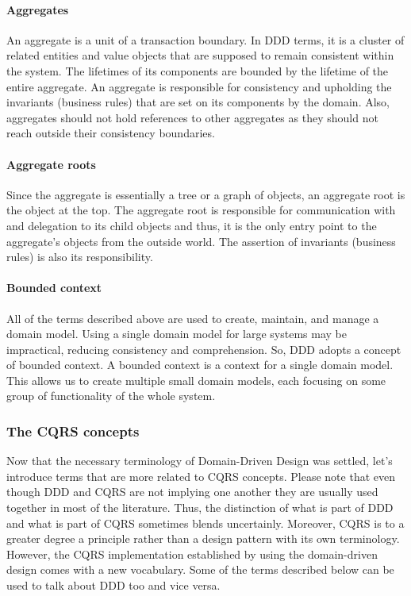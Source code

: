 \documentclass{book}
\begin{document}
\paragraph{Aggregates}\label{aggregates}

An aggregate is a unit of a transaction boundary. In DDD terms, it is a
cluster of related entities and value objects that are supposed to
remain consistent within the system. The lifetimes of its components are
bounded by the lifetime of the entire aggregate. An aggregate is
responsible for consistency and upholding the invariants (business
rules) that are set on its components by the domain. Also, aggregates
should not hold references to other aggregates as they should not reach
outside their consistency boundaries.~\cite{journey}

\paragraph{Aggregate roots}\label{aggregate-roots}

Since the aggregate is essentially a tree or a graph of objects, an
aggregate root is the object at the top. The aggregate root is
responsible for communication with and delegation to its child objects
and thus, it is the only entry point to the aggregate's objects from the
outside world. The assertion of invariants (business rules) is also its
responsibility.~\cite{journey}

\paragraph{Bounded context}\label{bounded-context}

All of the terms described above are used to create, maintain, and
manage a domain model. Using a single domain model for large systems may
be impractical, reducing consistency and comprehension. So, DDD adopts a
concept of bounded context. A bounded context is a context for a single
domain model. This allows us to create multiple small domain models,
each focusing on some group of functionality of the whole system.~\cite{journey}

\subsubsection{The CQRS concepts}\label{the-cqrs-concepts}

Now that the necessary terminology of Domain-Driven Design was settled,
let's introduce terms that are more related to CQRS concepts. Please
note that even though DDD and CQRS are not implying one another they are
usually used together in most of the literature. Thus, the distinction
of what is part of DDD and what is part of CQRS sometimes blends
uncertainly. Moreover, CQRS is to a greater degree a principle rather
than a design pattern with its own terminology. However, the CQRS
implementation established by using the domain-driven design comes with
a new vocabulary. Some of the terms described below can be used to talk
about DDD too and vice versa.~\cite{ddd-terms}
\end{document}
